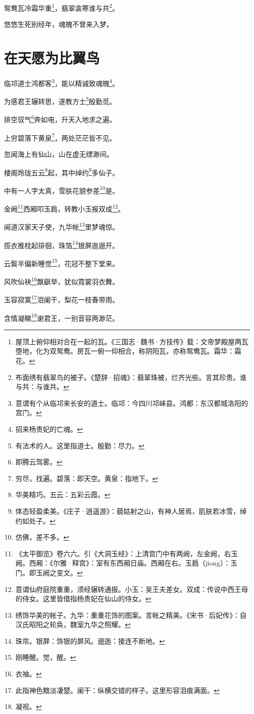 \documentclass{article}
\begin{document}
鸳鸯瓦冷霜华重\footnote{屋顶上俯仰相对合在一起的瓦。《三国志·魏书·方技传》载：文帝梦殿屋两瓦堕地，化为双鸳鸯。房瓦一俯一仰相合，称阴阳瓦，亦称鸳鸯瓦。霜华：霜花。}，翡翠衾寒谁与共\footnote{布面绣有翡翠鸟的被子。《楚辞·招魂》：翡翠珠被，烂齐光些。言其珍贵。谁与共：与谁共。}。

悠悠生死别经年，魂魄不曾来入梦。

\section{在天愿为比翼鸟}

临邛道士鸿都客\footnote{意谓有个从临邛来长安的道士。临邛：今四川邛崃县。鸿都：东汉都城洛阳的宫门。}，能以精诚致魂魄\footnote{招来杨贵妃的亡魂。}。

为感君王辗转思，遂教方士\footnote{有法术的人。这里指道士。殷勤：尽力。}殷勤觅。

排空驭气\footnote{即腾云驾雾。}奔如电，升天入地求之遍。

上穷碧落下黄泉\footnote{穷尽，找遍。碧落：即天空。黄泉：指地下。}，两处茫茫皆不见。

忽闻海上有仙山，山在虚无缥渺间。

楼阁玲珑五云\footnote{华美精巧。五云：五彩云霞。}起，其中绰约\footnote{体态轻盈柔美。《庄子·逍遥游》：藐姑射之山，有神人居焉，肌肤若冰雪，绰约如处子。}多仙子。

中有一人字太真，雪肤花貌参差\footnote{仿佛，差不多。}是。

金阙\footnote{《太平御览》卷六六。引《大洞玉经》：上清宫门中有两阙，左金阙，右玉阙。西厢：《尔雅·释宫》：室有东西厢日庙。西厢在右。玉扃（jiong）：玉门。即玉阙之变文。}西厢叩玉扃，转教小玉报双成\footnote{意谓仙府庭院重重，须经辗转通报。小玉：吴王夫差女。双成：传说中西王母的侍女。这里皆借指杨贵妃在仙山的侍女。}。

闻道汉家天子使，九华帐\footnote{绣饰华美的帐子。九华：重重花饰的图案。言帐之精美。《宋书·后妃传》：自汉氏昭阳之轮奂，魏室九华之照耀。}里梦魂惊。

揽衣推枕起徘徊，珠箔\footnote{珠帘。银屏：饰银的屏风。逦迤：接连不断地。}银屏迤逦开。

云鬓半偏新睡觉\footnote{刚睡醒。觉，醒。}，花冠不整下堂来。

风吹仙袂\footnote{衣袖。}飘飖举，犹似霓裳羽衣舞。

玉容寂寞\footnote{此指神色黯淡凄楚。阑干：纵横交错的样子。这里形容泪痕满面。}泪阑干，梨花一枝春带雨。

含情凝睇\footnote{凝视。}谢君王，一别音容两渺茫。
\end{document}

